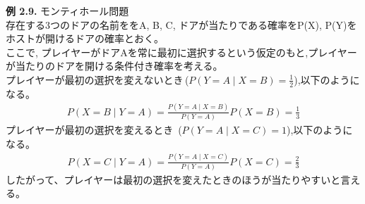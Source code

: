 \documentclass[dvipdfmx,10pt, a4j]{jarticle}
\theoremstyle{definition}
\begin{document}
    \noindent
    \textbf{例 2.9.} モンティホール問題\\
    存在する3つのドアの名前ををA, B, C, ドアが当たりである確率をP(X), P(Y)をホストが開けるドアの確率とおく。\\
    ここで, プレイヤーがドアAを常に最初に選択するという仮定のもと,プレイヤーが当たりのドアを開ける条件付き確率を考える。\\
    プレイヤーが最初の選択を変えないとき\,($P(Y = A \mid X = B) = \frac{1}{2}$),以下のようになる。
    \begin{align*}
        P(X = B \mid Y= A) = \frac{P(Y = A \mid X = B)}{P(Y = A)}P(X = B) = \frac{1}{3}
    \end{align*}
    プレイヤーが最初の選択を変えるとき\, ($P(Y = A \mid X = C) = 1$),以下のようになる。
    \begin{align*}
        P(X = C \mid Y= A) = \frac{P(Y = A \mid X = C)}{P(Y = A)}P(X = C) = \frac{2}{3}
    \end{align*}
    したがって、プレイヤーは最初の選択を変えたときのほうが当たりやすいと言える。
\end{document}
